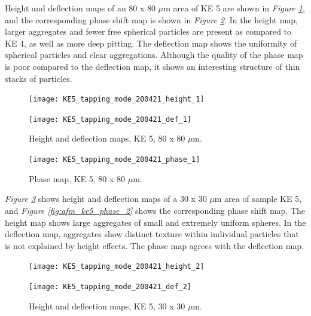 
Height and deflection maps of an 80 x 80 $\mu$m area of KE 5 are shown in \textit{Figure \ref{fig:afm_ke5_height_def_1}}, and the corresponding phase shift map is shown in \textit{Figure \ref{fig:afm_ke5_phase_1}}. In the height map, larger aggregates and fewer free spherical particles are present as compared to KE 4, as well as more deep pitting. The deflection map shows the uniformity of spherical particles and clear aggregations. Although the quality of the phase map is poor compared to the deflection map, it shows an interesting structure of thin stacks of particles.

\begin{figure}[H]
\centering
\begin{minipage}{.45\textwidth}
  \centering
  \texttt{[image: KE5\_tapping\_mode\_200421\_height\_1]}
\end{minipage}
\begin{minipage}{.45\textwidth}
  \centering
  \texttt{[image: KE5\_tapping\_mode\_200421\_def\_1]}
\end{minipage}
\caption[Height and deflection maps, KE 5]{Height and deflection maps, KE 5, 80 x 80 $\mu$m.}
\label{fig:afm_ke5_height_def_1}
\end{figure}

\begin{figure}[H]
\centering
  \texttt{[image: KE5\_tapping\_mode\_200421\_phase\_1]}
\caption[Phase map, KE 5]{Phase map, KE 5, 80 x 80 $\mu$m.}
\label{fig:afm_ke5_phase_1}
\end{figure}

\textit{Figure \ref{fig:afm_ke5_height_def_2}} shows height and deflection maps of a 30 x 30 $\mu$m area of sample KE 5, and \textit{Figure \ref{fig:afm_ke5_phase_2}} shows the corresponding phase shift map. The height map shows large aggregates of small and extremely uniform spheres. In the deflection map, aggregates show distinct texture within individual particles that is not explained by height effects. The phase map agrees with the deflection map.

\begin{figure}[H]
\centering
\begin{minipage}{.45\textwidth}
  \centering
  \texttt{[image: KE5\_tapping\_mode\_200421\_height\_2]}
\end{minipage}
\begin{minipage}{.45\textwidth}
  \centering
  \texttt{[image: KE5\_tapping\_mode\_200421\_def\_2]}
\end{minipage}
\caption[Height and deflection maps, KE 5]{Height and deflection maps, KE 5, 30 x 30 $\mu$m.}
\label{fig:afm_ke5_height_def_2}
\end{figure}

